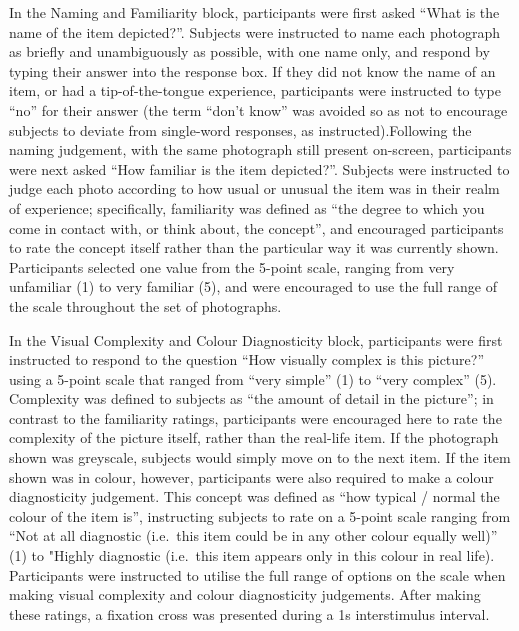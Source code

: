 \documentclass[
  11pt,
]{article}
\begin{document}
In the Naming and Familiarity block, participants were first asked
``What is the name of the item depicted?''. Subjects were instructed to
name each photograph as briefly and unambiguously as possible, with one
name only, and respond by typing their answer into the response box. If
they did not know the name of an item, or had a tip-of-the-tongue
experience, participants were instructed to type ``no'' for their answer
(the term ``don't know'' was avoided so as not to encourage subjects to
deviate from single-word responses, as instructed).Following the naming
judgement, with the same photograph still present on-screen,
participants were next asked ``How familiar is the item depicted?''.
Subjects were instructed to judge each photo according to how usual or
unusual the item was in their realm of experience; specifically,
familiarity was defined as ``the degree to which you come in contact
with, or think about, the concept'', and encouraged participants to rate
the concept itself rather than the particular way it was currently
shown. Participants selected one value from the 5-point scale, ranging
from very unfamiliar (1) to very familiar (5), and were encouraged to
use the full range of the scale throughout the set of photographs.

In the Visual Complexity and Colour Diagnosticity block, participants
were first instructed to respond to the question ``How visually complex
is this picture?'' using a 5-point scale that ranged from ``very
simple'' (1) to ``very complex'' (5). Complexity was defined to subjects
as ``the amount of detail in the picture''; in contrast to the
familiarity ratings, participants were encouraged here to rate the
complexity of the picture itself, rather than the real-life item. If the
photograph shown was greyscale, subjects would simply move on to the
next item. If the item shown was in colour, however, participants were
also required to make a colour diagnosticity judgement. This concept was
defined as ``how typical / normal the colour of the item is'',
instructing subjects to rate on a 5-point scale ranging from ``Not at
all diagnostic (i.e.~this item could be in any other colour equally
well)'' (1) to "Highly diagnostic (i.e.~this item appears only in this
colour in real life). Participants were instructed to utilise the full
range of options on the scale when making visual complexity and colour
diagnosticity judgements. After making these ratings, a fixation cross
was presented during a 1s interstimulus interval.
\end{document}
